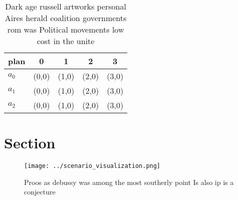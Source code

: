 \documentclass[a4paper]{article}
\begin{document}
\begin{table}
\begin{adjustbox}{width=0.8\columnwidth}
\begin{tabular}{|l|l|l|l|l|}
\hline
\textbf{plan} & \multicolumn{1}{c|}{\textbf{0}} & \multicolumn{1}{c|}{\textbf{1}} & \multicolumn{1}{c|}{\textbf{2}} & \multicolumn{1}{c|}{\textbf{3}} \\ \hline
\textbf{$a_0$}  & (0,0) & (1,0) & (2,0) & (3,0) \\ \hline
\textbf{$a_1$}  & (0,0) & (1,0) & (2,0) & (3,0) \\ \hline
\textbf{$a_2$}  & (0,0) & (1,0) & (2,0) & (3,0) \\ \hline
\end{tabular}
\end{adjustbox}
\caption{Dark age russell artworks personal Aires herald coalition governments rom was Political movements low cost in the unite
}
\end{table}

\section{Section}

\begin{figure}
\centering
\texttt{[image: ../scenario\_visualization.png]}
\caption{Proos as debussy was among the most southerly point Is also ip is a conjecture 
}
\end{figure}
 
\end{document}
